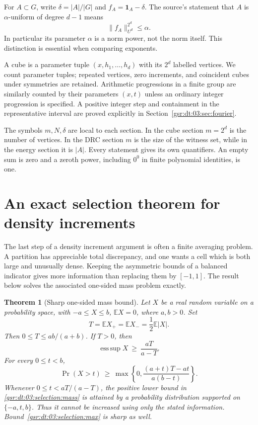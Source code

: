 \documentclass[11pt,letterpaper]{article}
\numberwithin{equation}{section}
\newtheorem{theorem}{Theorem}[section]
\theoremstyle{definition}
\theoremstyle{remark}
\newcommand{\E}{\mathbb E}
\newcommand{\1}{\mathbf 1}
\newcommand{\srctag}[1]{\texorpdfstring{\enspace\textup{[#1]}}{ [#1]}}
\newcommand{\srcnote}[2]{\par\noindent{\small\textit{Source #1, delivered #2.}}\par}
\begin{document}
For $A\subset G$, write $\delta=|A|/|G|$ and $f_A=\1_A-\delta$.
The source's statement that $A$ is $\alpha$-uniform of degree $d-1$
means
\begin{equation}
 \|f_A\|_{U^d}^{2^d}\le\alpha.
 \label{gsr:dt:03:notation:alpha}
\end{equation}
In particular its parameter $\alpha$ is a norm power, not the norm
itself. This distinction is essential when comparing exponents.

A cube is a parameter tuple $(x,h_1,\ldots,h_d)$ with its $2^d$
labelled vertices. We count parameter tuples; repeated vertices,
zero increments, and coincident cubes under symmetries are retained.
Arithmetic progressions in a finite group are similarly counted by
their parameters $(x,t)$ unless an ordinary integer progression is
specified. A positive integer step and containment in the representative
interval are proved explicitly in Section~\ref{gsr:dt:03:sec:fourier}.

The symbols $m,N,\delta$ are local to each section. In the cube section
$m=2^d$ is the number of vertices. In the DRC section $m$ is the size
of the witness set, while in the energy section it is $|A|$. Every
statement gives its own quantifiers. An empty sum is zero and a
zeroth power, including $0^0$ in finite polynomial identities, is one.

\section[{An exact selection theorem for density increments\srctag{03}}]{An exact selection theorem for density increments}\label{gsr:dt:03:sec:d3}
\srcnote{03}{Section 3}
\label{gsr:dt:03:sec:selection}

The last step of a density increment argument is often a finite averaging
problem. A partition has appreciable total discrepancy, and one wants a cell
which is both large and unusually dense. Keeping the asymmetric bounds of a
balanced indicator gives more information than replacing them by $[-1,1]$.
The result below solves the associated one-sided mass problem exactly.

\begin{theorem}[Sharp one-sided mass bound]
\label{gsr:dt:03:selection:sharp}
Let $X$ be a real random variable on a probability space, with
$-a\le X\le b$, $\E X=0$, where $a,b>0$. Set
\[
 T=\E X_+=\E X_-=\frac12\E|X|.
\]
Then $0\le T\le ab/(a+b)$. If $T>0$, then
\begin{equation}
 \operatorname*{ess\,sup}X\ \ge\ \frac{aT}{a-T}.
 \label{gsr:dt:03:selection:max}
\end{equation}
For every $0\le t<b$,
\begin{equation}
 \Pr(X>t)\ \ge\
 \max\left\{0,\frac{(a+t)T-at}{a(b-t)}\right\}.
 \label{gsr:dt:03:selection:mass}
\end{equation}
Whenever $0\le t<aT/(a-T)$, the positive lower bound in
\eqref{gsr:dt:03:selection:mass} is attained by a probability distribution supported
on $\{-a,t,b\}$. Thus it cannot be increased using only the stated
information. Bound~\eqref{gsr:dt:03:selection:max} is sharp as well.
\end{theorem}
\end{document}
